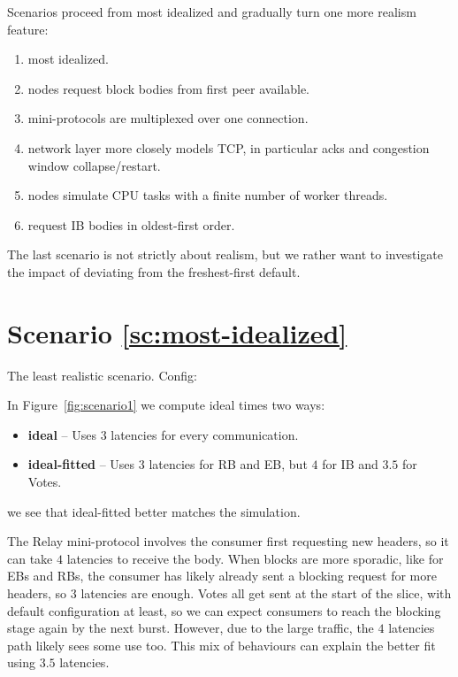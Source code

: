 \documentclass[11pt,a4paper]{article}
\begin{document}
Scenarios proceed from most idealized and gradually turn one more realism feature:
\begin{enumerate}
    \item \label{sc:most-idealized} most idealized.
    \item \label{sc:request-from-first} nodes request block bodies from first peer available.
    \item \label{sc:multiplexing} mini-protocols are multiplexed over one connection.
    \item \label{sc:tcp} network layer more closely models TCP, in particular acks
          and congestion window collapse/restart.
    \item \label{sc:boundedcpu} nodes simulate CPU tasks with a finite number of worker threads.
    \item \label{sc:order} request IB bodies in oldest-first order.
\end{enumerate}
The last scenario is not strictly about realism, but we rather want to
investigate the impact of deviating from the freshest-first default.

\section{Scenario \ref{sc:most-idealized}}
\label{scenario1}
The least realistic scenario. Config:


In Figure~\ref{fig:scenario1} we compute ideal times two ways:
\begin{itemize}
    \item \textbf{ideal} -- Uses $3$ latencies for every communication.
    \item \textbf{ideal-fitted} -- Uses $3$ latencies for RB and EB, but $4$ for IB and $3.5$ for Votes.
\end{itemize}
we see that ideal-fitted better matches the simulation.

The Relay mini-protocol involves the consumer first requesting new headers, so
it can take $4$ latencies to receive the body. When blocks are more sporadic,
like for EBs and RBs, the consumer has likely already sent a blocking request
for more headers, so $3$ latencies are enough.
Votes all get sent at the start of the slice, with default configuration at least, so we can expect consumers to reach the blocking stage again by the next burst. However, due to the large traffic, the $4$ latencies path likely sees some use too. This mix of behaviours can explain the better fit using $3.5$ latencies.
\end{document}

